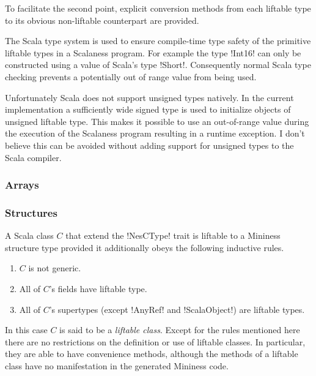 To facilitate the second point, explicit conversion methods from each liftable type to its
obvious non-liftable counterpart are provided.


The Scala type system is used to ensure compile-time type safety of the primitive liftable types
in a Scalaness program. For example the type !Int16! can only be constructed using a value of
Scala's type !Short!. Consequently normal Scala type checking prevents a potentially out of
range value from being used.

Unfortunately Scala does not support unsigned types natively. In the current implementation a
sufficiently wide signed type is used to initialize objects of unsigned liftable type. This
makes it possible to use an out-of-range value during the execution of the Scalaness program
resulting in a runtime exception. I don't believe this can be avoided without adding support for
unsigned types to the Scala compiler.

\subsubsection{Arrays}
\label{section-arrays-design}

\subsubsection{Structures}
\label{section-structures-design}

A Scala class $C$ that extend the !NesCType! trait is liftable to a Mininess structure type
provided it additionally obeys the following inductive rules.

\begin{enumerate}
\item $C$ is not generic.
\item All of $C$'s fields have liftable type.
\item All of $C$'s supertypes (except !AnyRef! and !ScalaObject!) are liftable types.
\end{enumerate}

In this case $C$ is said to be a \textit{liftable class}. Except for the rules mentioned here
there are no restrictions on the definition or use of liftable classes. In particular, they are
able to have convenience methods, although the methods of a liftable class have no manifestation
in the generated Mininess code.

